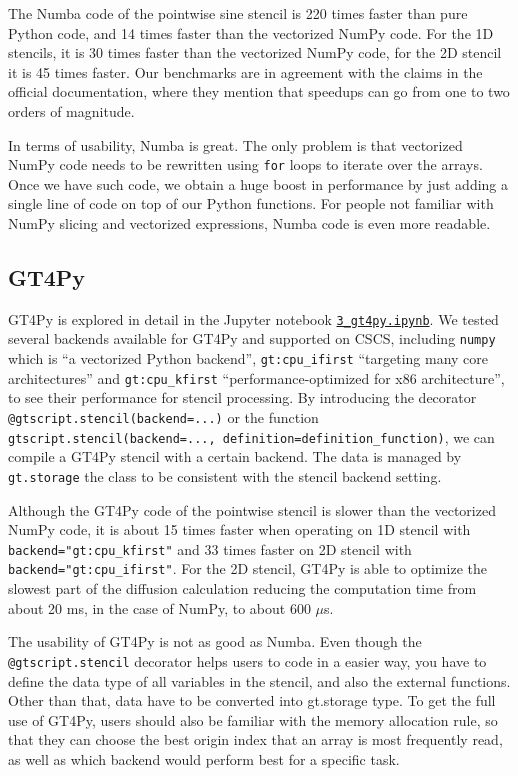 \documentclass[12pt]{article}
\begin{document}
The Numba code of the pointwise sine stencil is 220 times faster than pure Python code, and 14 times faster than the vectorized NumPy code. For the 1D stencils, it is 30 times faster than the vectorized NumPy code, for the 2D stencil it is 45 times faster. Our benchmarks are in agreement with the claims in the official documentation, where they mention that speedups can go from one to two orders of magnitude.

In terms of usability, Numba is great. The only problem is that vectorized NumPy code needs to be rewritten using \texttt{for} loops to iterate over the arrays. Once we have such code, we obtain a huge boost in performance by just adding a single line of code on top of our Python functions. For people not familiar with NumPy slicing and vectorized expressions, Numba code is even more readable.

\subsection{GT4Py}

GT4Py is explored in detail in the Jupyter notebook \href{run:./3_gt4py.ipynb}{\texttt{3\_gt4py.ipynb}}. We tested several backends available for GT4Py and supported on CSCS, including \texttt{numpy} which is ``a vectorized Python backend'', \texttt{gt:cpu\_ifirst} ``targeting many core architectures'' and \texttt{gt:cpu\_kfirst} ``performance-optimized for x86 architecture'', to see their performance for stencil processing. By introducing the decorator \texttt{@gtscript.stencil(backend=...)} or the function \texttt{gtscript.stencil(backend=..., definition=definition\_function)}, we can compile a GT4Py stencil with a certain backend. The data is managed by \texttt{gt.storage} the class to be consistent with the stencil backend setting.

Although the GT4Py code of the pointwise stencil is slower than the vectorized NumPy code, it is about 15 times faster when operating on 1D stencil with \texttt{backend="gt:cpu\_kfirst"} and 33 times faster on 2D stencil with \texttt{backend="gt:cpu\_ifirst"}. For the 2D stencil, GT4Py is able to optimize the slowest part of the diffusion calculation reducing the computation time from about 20 ms, in the case of NumPy, to about 600 $\mu$s.

The usability of GT4Py is not as good as Numba. Even though the \texttt{@gtscript.stencil} decorator helps users to code in a easier way, you have to define the data type of all variables in the stencil, and also the external functions. Other than that, data have to be converted into gt.storage type. To get the full use of GT4Py, users should also be familiar with the memory allocation rule, so that they can choose the best origin index that an array is most frequently read, as well as which backend would perform best for a specific task.
\end{document}
